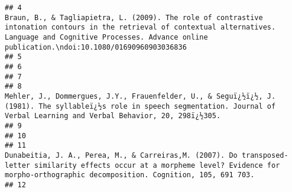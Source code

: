 \documentclass[
  english,
  man]{apa6}
\begin{document}
\begin{verbatim}
## 4                                                                                           Braun, B., & Tagliapietra, L. (2009). The role of contrastive intonation contours in the retrieval of contextual alternatives. Language and Cognitive Processes. Advance online publication.\ndoi:10.1080/01690960903036836
## 5                                                                                                                                                                                                                                                                                                                      
## 6                                                                                                                                                                                                                                                                                                                      
## 7                                                                                                                                                                                                                                                                                                                      
## 8                                                                                                                                 Mehler, J., Dommergues, J.Y., Frauenfelder, U., & Seguï¿½ï¿½, J. (1981). The syllableï¿½s role in speech segmentation. Journal of Verbal Learning and Verbal Behavior, 20, 298ï¿½305.
## 9                                                                                                                                                                                                                                                                                                                      
## 10                                                                                                                                                                                                                                                                                                                     
## 11                                                                                                                     Dunabeitia, J. A., Perea, M., & Carreiras,M. (2007). Do transposed-letter similarity effects occur at a morpheme level? Evidence for morpho-orthographic decomposition. Cognition, 105, 691 703.
## 12                                                                                                                                                                                                                                                                                                                     

\end{verbatim}
\end{document}
